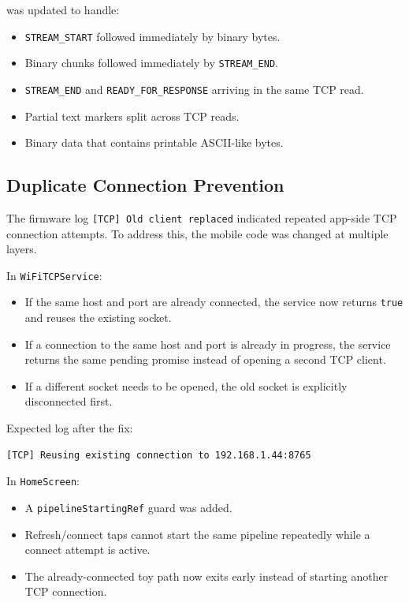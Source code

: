 \documentclass[11pt,a4paper]{article}
\begin{document}
was updated to handle:

\begin{itemize}[leftmargin=*]
  \item \texttt{STREAM\_START} followed immediately by binary bytes.
  \item Binary chunks followed immediately by \texttt{STREAM\_END}.
  \item \texttt{STREAM\_END} and \texttt{READY\_FOR\_RESPONSE} arriving in the same TCP read.
  \item Partial text markers split across TCP reads.
  \item Binary data that contains printable ASCII-like bytes.
\end{itemize}

\subsection{Duplicate Connection Prevention}

The firmware log \texttt{[TCP] Old client replaced} indicated repeated app-side TCP connection attempts. To address this, the mobile code was changed at multiple layers.

In \texttt{WiFiTCPService}:

\begin{itemize}[leftmargin=*]
  \item If the same host and port are already connected, the service now returns \texttt{true} and reuses the existing socket.
  \item If a connection to the same host and port is already in progress, the service returns the same pending promise instead of opening a second TCP client.
  \item If a different socket needs to be opened, the old socket is explicitly disconnected first.
\end{itemize}

Expected log after the fix:

\begin{lstlisting}[style=logstyle]
[TCP] Reusing existing connection to 192.168.1.44:8765
\end{lstlisting}

In \texttt{HomeScreen}:

\begin{itemize}[leftmargin=*]
  \item A \texttt{pipelineStartingRef} guard was added.
  \item Refresh/connect taps cannot start the same pipeline repeatedly while a connect attempt is active.
  \item The already-connected toy path now exits early instead of starting another TCP connection.
\end{itemize}
\end{document}
